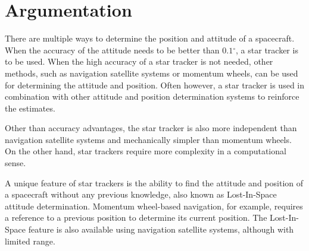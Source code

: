 \documentclass[12pt]{report}
\begin{document}
\section{Argumentation}
There are multiple ways to determine the position and attitude of a spacecraft. When the accuracy of the attitude needs to be better than $0.1{^\circ}$, a star tracker is to be used. When the high accuracy of a star tracker is not needed, other methods, such as navigation satellite systems or momentum wheels, can be used for determining the attitude and position. Often however, a star tracker is used in combination with other attitude and position determination systems to reinforce the estimates.
\par
Other than accuracy advantages, the star tracker is also more independent than navigation satellite systems and mechanically simpler than momentum wheels. On the other hand, star trackers require more complexity in a computational sense. \citep{SatDesgin}
\par
A unique feature of star trackers is the ability to find the attitude and position of a spacecraft without any previous knowledge, also known as Lost-In-Space attitude determination. Momentum wheel-based navigation, for example, requires a reference to a previous position to determine its current position. The Lost-In-Space feature is also available using navigation satellite systems, although with limited range. \citep{SatDesgin}
\end{document}
